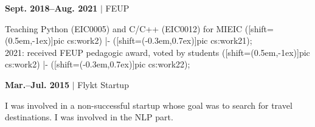 \documentclass[11pt]{article}
\begin{document}
\begin{minipage}[t]{0.55\textwidth}
\begin{samepage}
\begin{adjustwidth}{1.5em}{}
\end{adjustwidth}
\end{samepage}\begin{samepage}\textbf{Sept. 2018--Aug. 2021} $\vert$ FEUP
\\\begin{adjustwidth}{1.5em}{}%
\footnotesize
{}Teaching Python (EIC0005) and C/C++ (EIC0012) for MIEIC
  ([shift={(0.5em,-1ex)}]pic cs:work2) |- ([shift={(-0.3em,0.7ex)}]pic cs:work21);\\2021: received FEUP pedagogic award, voted by students
  ([shift={(0.5em,-1ex)}]pic cs:work2) |- ([shift={(-0.3em,0.7ex)}]pic cs:work22);\\
\end{adjustwidth}
\end{samepage}\begin{samepage}\textbf{Mar.--Jul. 2015} $\vert$ Flykt Startup
\begin{adjustwidth}{1.5em}{}%
\footnotesize
I was involved in a non-successful startup whose goal was to search for travel destinations. I was involved in the NLP part.\par\end{adjustwidth}
\end{samepage}
\end{minipage}
%
\hfill\raisebox{-0.54\textheight}{\rule{0.5pt}{0.55\textheight}}\hfill%
%
\end{document}
